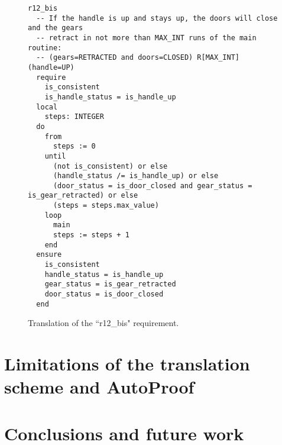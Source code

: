 \begin{figure}
\begin{lstlisting}
r12_bis
  -- If the handle is up and stays up, the doors will close and the gears
  -- retract in not more than MAX_INT runs of the main routine:
  -- (gears=RETRACTED and doors=CLOSED) R[MAX_INT] (handle=UP)
  require
    is_consistent
  	is_handle_status = is_handle_up
  local
    steps: INTEGER
  do
    from
      steps := 0
    until
      (not is_consistent) or else
      (handle_status /= is_handle_up) or else
      (door_status = is_door_closed and gear_status = is_gear_retracted) or else
      (steps = steps.max_value)
    loop
      main
      steps := steps + 1
    end
  ensure
  	is_consistent
    handle_status = is_handle_up
    gear_status = is_gear_retracted
    door_status = is_door_closed
  end

\end{lstlisting}
\caption{Translation of the ``r12\_bis" requirement.}
\label{fig:r12_bis_translation}
\end{figure}


\section{Limitations of the translation scheme and AutoProof}
\label{sec:limitations}



\section{Conclusions and future work}
\label{sec:conclusions}


{{{
	
	
}}}


